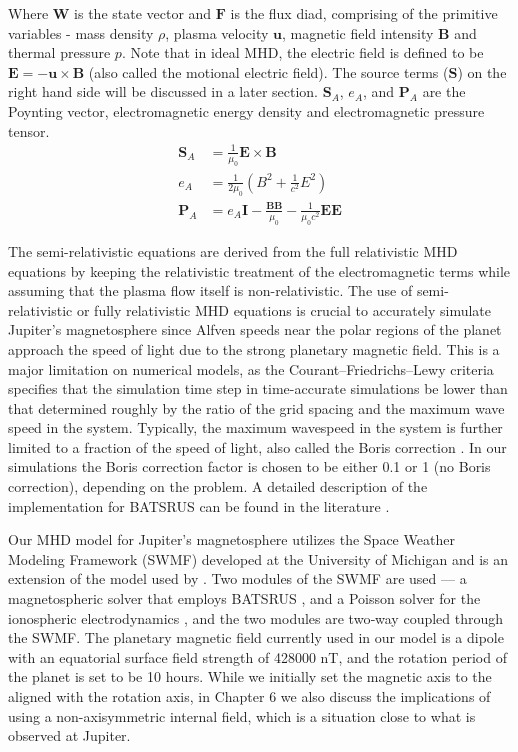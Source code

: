 Where $\mathbf{W}$ is the state vector and $\mathbf{F}$ is the flux diad, comprising of the primitive variables - mass density $\rho$, plasma velocity $\mathbf{u}$, magnetic field intensity $\mathbf{B}$ and thermal pressure $p$. Note that in ideal MHD, the electric field is defined to be $\mathbf{E} = -\mathbf{u} \times \mathbf{B}$ (also called the motional electric field). The source terms ($\mathbf{S}$) on the right hand side will be discussed in a later section. $\mathbf{S}_A$, $e_A$, and $\mathbf{P}_A$ are the Poynting vector, electromagnetic energy density and electromagnetic pressure tensor.
\begin{align}
    \mathbf{S}_A & = \frac{1}{\mu_0} \mathbf{E} \times \mathbf{B}\\
    e_A &= \frac{1}{2\mu_0} \left( B^2 + \frac{1}{c^2} E^2\right)\\
    \mathbf{P}_A &= e_A \mathbf{I} - \frac{\mathbf{B}\mathbf{B}}{\mu_0} - \frac{1}{\mu_0 c^2}\mathbf{E}\mathbf{E}
\end{align}

The semi-relativistic equations are derived from the full relativistic MHD equations \cite{Gombosi2002b} by keeping the relativistic treatment of the electromagnetic terms while assuming that the plasma flow itself is non-relativistic. The use of semi-relativistic or fully relativistic MHD equations is crucial to accurately simulate Jupiter's magnetosphere since Alfven speeds near the polar regions of the planet approach the speed of light due to the strong planetary magnetic field. This is a major limitation on numerical models, as the Courant–Friedrichs–Lewy criteria specifies that the simulation time step in time-accurate simulations be lower than that determined roughly by the ratio of the grid spacing and the maximum wave speed in the system. Typically, the maximum wavespeed in the system is further limited to a fraction of the speed of light, also called the Boris correction \cite{Toth2011}. In our simulations the Boris correction factor is chosen to be either 0.1 or 1 (no Boris correction), depending on the problem. A detailed description of the implementation for BATSRUS can be found in the literature \cite{Gombosi2002b, Toth2012a}.

Our MHD model for Jupiter's magnetosphere utilizes the Space Weather Modeling Framework (SWMF) developed at the University of Michigan \cite{Toth2012a} and is an extension of the model used by \cite{Hansen2001a}. Two modules of the SWMF are used — a magnetospheric solver that employs BATSRUS \cite{Gombosi2002b,Powell1999a}, and a Poisson solver for the ionospheric electrodynamics \cite{Ridley2004IonosphericConductance}, and the two modules are two‐way coupled through the SWMF.  The planetary magnetic field currently used in our model is a dipole with an equatorial surface field strength of 428000 nT, and the rotation period of the planet is set to be 10 hours. While we initially set the magnetic axis to the aligned with the rotation axis, in Chapter 6 we also discuss the implications of using a non-axisymmetric internal field, which is a situation close to what is observed at Jupiter. 

